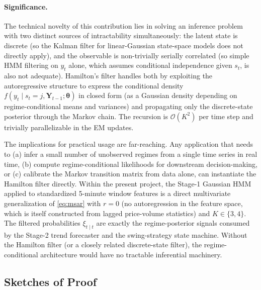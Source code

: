 \documentclass[11pt]{article}
\begin{document}
\paragraph{Significance.}  The technical novelty of this contribution lies in solving an inference problem with two distinct sources of intractability simultaneously: the latent state is discrete (so the Kalman filter for linear-Gaussian state-space models does not directly apply), and the observable is non-trivially serially correlated (so simple HMM filtering on $y_t$ alone, which assumes conditional independence given $s_t$, is also not adequate).  Hamilton's filter handles both by exploiting the autoregressive structure to express the conditional density $f(y_t \mid s_t = j, \bm{Y}_{t-1}; \bm{\theta})$ in closed form (as a Gaussian density depending on regime-conditional means and variances) and propagating only the discrete-state posterior through the Markov chain.  The recursion is $\mathcal{O}(K^2)$ per time step and trivially parallelizable in the EM updates.

The implications for practical usage are far-reaching.  Any application that needs to (a) infer a small number of unobserved regimes from a single time series in real time, (b) compute regime-conditional likelihoods for downstream decision-making, or (c) calibrate the Markov transition matrix from data alone, can instantiate the Hamilton filter directly.  Within the present project, the Stage-1 Gaussian HMM applied to standardized 5-minute window features is a direct multivariate generalization of \eqref{eq:msar} with $r = 0$ (no autoregression in the feature space, which is itself constructed from lagged price-volume statistics) and $K \in \{3,4\}$.  The filtered probabilities $\xi_{t \mid t}$ are exactly the regime-posterior signals consumed by the Stage-2 trend forecaster and the swing-strategy state machine.  Without the Hamilton filter (or a closely related discrete-state filter), the regime-conditional architecture would have no tractable inferential machinery.

\subsection{Sketches of Proof}
\end{document}
